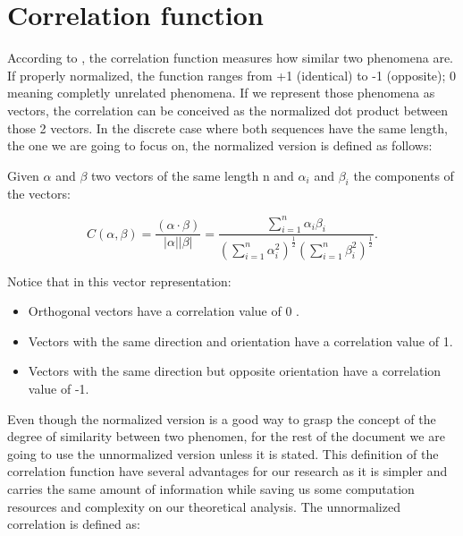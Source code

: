 
\section{Correlation function}

According to \citet{golomb_ref}, the correlation function measures how similar
two phenomena are. If properly normalized, the function ranges from
+1 (identical) to -1 (opposite); 0 meaning completly unrelated phenomena.
If we represent those phenomena as vectors, the correlation can be conceived
as the normalized dot product between those 2 vectors.
In the discrete case where both sequences have the same length, the one we are
going to focus on, the normalized version is defined as follows:

\begin{definition}\label{def:1}

Given $\alpha$ and $\beta$ two vectors of the same length n and $\alpha_{i}$
and $\beta_{i}$ the components of the vectors:

\begin{equation}\label{eq:1}
C(\alpha , \beta)=\frac{(\alpha \cdot  \beta)}{|\alpha||\beta|}=\frac{\sum_{i=1}^{n} \alpha_{i}\beta_{i}}{(\sum_{i=1}^{n} \alpha_{i}^{2})^{\frac{1}{2}}(\sum_{i=1}^{n} \beta_{i}^{2})^\frac{1}{2}}.
\end{equation}
\end{definition}

Notice that in this vector
representation:
\begin{itemize}
  \item Orthogonal vectors have a correlation value of 0 .
  \item Vectors with the same direction and orientation have a correlation
  value of 1.
  \item Vectors with the same direction but opposite orientation have a
  correlation value of -1.
\end{itemize}

Even though the normalized version is a good way to grasp the
concept of the degree of similarity between two phenomen, for the rest of the
document we are going to use the unnormalized version unless it is stated.
This definition of the correlation function have several advantages for our
research as it is simpler and carries the same amount of information while
saving us some computation resources and complexity on our theoretical
analysis. The unnormalized correlation is defined as:

